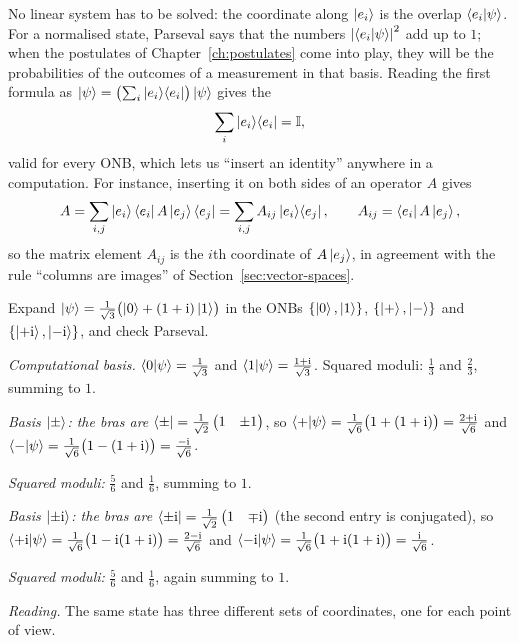 No linear system has to be solved: the coordinate along $\left|e_i\right\rangle$ is the overlap $\left\langle e_i\middle|\psi\right\rangle$. For a normalised state, Parseval says that the numbers $\left|\left\langle e_i\middle|\psi\right\rangle\right|^2$ add up to $1$; when the postulates of Chapter~\ref{ch:postulates} come into play, they will be the probabilities of the outcomes of a measurement in that basis. Reading the first formula as $\left|\psi\right\rangle=\bigl(\sum_i\left|e_i\right\rangle\!\left\langle e_i\right|\bigr)\left|\psi\right\rangle$ gives the 
\[
  \sum_i\left|e_i\right\rangle\!\left\langle e_i\right|=\mathbb{I},
\]
valid for every ONB, which lets us ``insert an identity'' anywhere in a computation. For instance, inserting it on both sides of an operator $A$ gives
\[
  A=\sum_{i,j}\left|e_i\right\rangle\left\langle e_i\right|A\left|e_j\right\rangle\left\langle e_j\right|=\sum_{i,j}A_{ij}\left|e_i\right\rangle\!\left\langle e_j\right|,\qquad A_{ij}=\left\langle e_i\right|A\left|e_j\right\rangle,
\]
so the matrix element $A_{ij}$ is the $i$th coordinate of $A\left|e_j\right\rangle$, in agreement with the rule ``columns are images'' of Section~\ref{sec:vector-spaces}.

\begin{example}\label{ex:parseval}
  Expand $\left|\psi\right\rangle=\frac1{\sqrt3}\bigl(\left|0\right\rangle+(1+\mathrm{i})\left|1\right\rangle\bigr)$ in the ONBs $\{\left|0\right\rangle,\left|1\right\rangle\}$, $\{\left|+\right\rangle,\left|-\right\rangle\}$ and $\{\left|+\mathrm{i}\right\rangle,\left|-\mathrm{i}\right\rangle\}$, and check Parseval.
\end{example}
\begin{solution}
  \begin{steps}
    \item \emph{Computational basis.} $\left\langle0\middle|\psi\right\rangle=\frac1{\sqrt3}$ and $\left\langle1\middle|\psi\right\rangle=\frac{1+\mathrm{i}}{\sqrt3}$. Squared moduli: $\tfrac13$ and $\tfrac23$, summing to $1$.
    \item \emph{Basis $\left|\pm\right\rangle$: the bras are} $\left\langle\pm\right|=\frac1{\sqrt2}\begin{pmatrix}1&\pm1\end{pmatrix}$, so $\left\langle+\middle|\psi\right\rangle=\frac{1}{\sqrt6}\bigl(1+(1+\mathrm{i})\bigr)=\frac{2+\mathrm{i}}{\sqrt6}$ and $\left\langle-\middle|\psi\right\rangle=\frac{1}{\sqrt6}\bigl(1-(1+\mathrm{i})\bigr)=\frac{-\mathrm{i}}{\sqrt6}$.
    \item \emph{Squared moduli:} $\tfrac56$ and $\tfrac16$, summing to $1$.
    \item \emph{Basis $\left|\pm\mathrm{i}\right\rangle$: the bras are} $\left\langle\pm\mathrm{i}\right|=\frac1{\sqrt2}\begin{pmatrix}1&\mp\mathrm{i}\end{pmatrix}$ (the second entry is conjugated), so $\left\langle+\mathrm{i}\middle|\psi\right\rangle=\frac1{\sqrt6}\bigl(1-\mathrm{i}(1+\mathrm{i})\bigr)=\frac{2-\mathrm{i}}{\sqrt6}$ and $\left\langle-\mathrm{i}\middle|\psi\right\rangle=\frac1{\sqrt6}\bigl(1+\mathrm{i}(1+\mathrm{i})\bigr)=\frac{\mathrm{i}}{\sqrt6}$.
    \item \emph{Squared moduli:} $\tfrac56$ and $\tfrac16$, again summing to $1$.
    \item \emph{Reading.} The same state has three different sets of coordinates, one for each point of view.
  \end{steps}
\end{solution}

